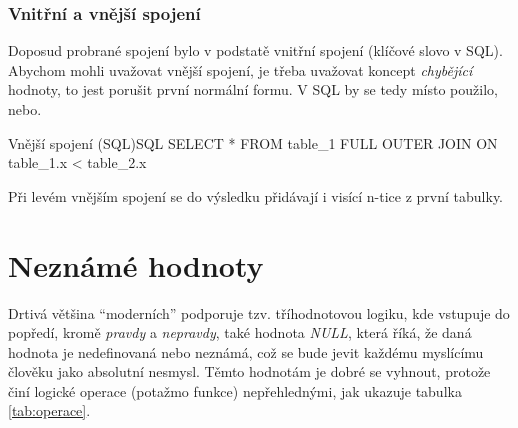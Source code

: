 \subsubsection{Vnitřní a vnější spojení}
Doposud probrané spojení bylo v podstatě vnitřní spojení (klíčové slovo v SQL). Abychom mohli uvažovat vnější spojení, je třeba uvažovat koncept \textit{chybějící} hodnoty, to jest porušit první normální formu. V SQL by se tedy místo použilo, nebo.
\begin{upcode}{Vnější spojení (SQL)}{}{SQL}
SELECT * FROM table_1 FULL OUTER JOIN ON table_1.x < table_2.x
\end{upcode}
Při levém vnějším spojení se do výsledku přidávají i visící n-tice z první tabulky.

\section{Neznámé hodnoty}
Drtivá většina \enquote{moderních}  podporuje tzv. tříhodnotovou logiku, kde vstupuje do popředí, kromě \textit{pravdy} a \textit{nepravdy}, také hodnota \textit{NULL}, která říká, že daná hodnota je nedefinovaná nebo neznámá, což se bude jevit každému myslícímu člověku jako absolutní nesmysl. Těmto hodnotám je dobré se vyhnout, protože činí logické operace (potažmo funkce) nepřehlednými, jak ukazuje tabulka \ref{tab:operace}.

